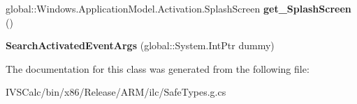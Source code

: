 \begin{DoxyCompactItemize}
global\+::\+Windows.\+Application\+Model.\+Activation.\+Splash\+Screen {\bfseries get\+\_\+\+Splash\+Screen} ()
\item 
\mbox{\label{class_windows_1_1_application_model_1_1_activation_1_1_search_activated_event_args_aea1c8ddcb207b9f98acf647773786b5f}} 
{\bfseries Search\+Activated\+Event\+Args} (global\+::\+System.\+Int\+Ptr dummy)
\end{DoxyCompactItemize}


The documentation for this class was generated from the following file\+:\begin{DoxyCompactItemize}
\item 
I\+V\+S\+Calc/bin/x86/\+Release/\+A\+R\+M/ilc/Safe\+Types.\+g.\+cs\end{DoxyCompactItemize}

